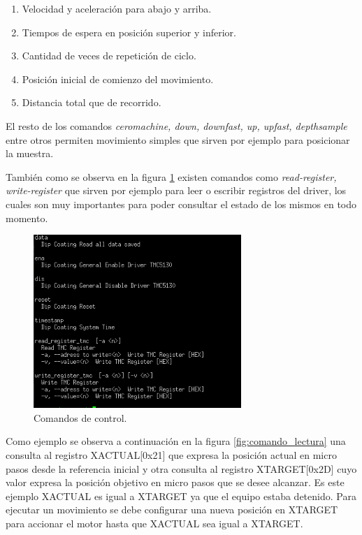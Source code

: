 \begin{enumerate}
\item Velocidad y aceleración para abajo y arriba.
\item Tiempos de espera en posición superior y inferior.
\item Cantidad de veces de repetición de ciclo.
\item Posición inicial de comienzo del movimiento.
\item Distancia total que de recorrido.
\end{enumerate}

El resto de los comandos \textit{ceromachine, down, downfast, up, upfast, depthsample} entre otros permiten movimiento simples que sirven por ejemplo para posicionar la muestra.

También como se observa en la figura \ref{fig:consola_comandos} existen comandos como \textit{read-register, write-register} que sirven por ejemplo para leer o escribir registros del driver, los cuales son muy importantes para poder consultar el estado de los mismos en todo momento.


\begin{figure}[h!]
	\centering
	\includegraphics[width=0.7\textwidth]{./Figures/consola_3.png}
	\caption{Comandos de control.}
	\label{fig:consola_comandos}
\end{figure}

Como ejemplo se observa a continuación en la figura \ref{fig:comando_lectura} una consulta al registro XACTUAL[0x21] que expresa la posición actual en micro pasos desde la referencia inicial y otra consulta al registro XTARGET[0x2D] cuyo valor expresa la posición objetivo en micro pasos que se desee alcanzar.
Es este ejemplo XACTUAL es igual a XTARGET ya que el equipo estaba detenido. Para ejecutar un movimiento se debe configurar una nueva posición en XTARGET para accionar el motor hasta que  XACTUAL sea igual a XTARGET.


